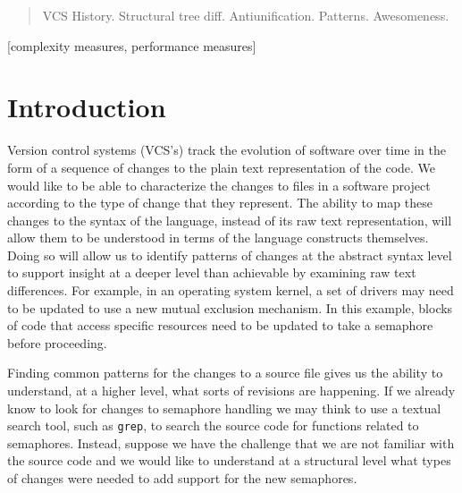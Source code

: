 \documentclass{acm_proc_article-sp}
\begin{document}
\maketitle
\begin{abstract}
VCS History. Structural tree diff. Antiunification. Patterns.
Awesomeness.
\end{abstract}

[complexity measures, performance measures]



\section{Introduction}

Version control systems (VCS's) track the evolution of software over time in the form
of a sequence of changes to the plain text representation of the code.
We would like to be able to characterize the changes to files in a software
project according to the type of change that they represent.  The ability to
map these changes to the syntax of the language, instead of its raw text
representation, will allow them to be understood in terms of the language
constructs themselves.  Doing so will allow us to identify patterns of
changes at the abstract syntax level to support insight at a deeper level
than achievable by examining raw text differences.  For example, in
an operating system kernel, a set of drivers may need to be updated to use a
new mutual exclusion mechanism. In this example, blocks of code that access
specific resources need to be updated to take a semaphore before proceeding.

Finding common patterns for the changes to a source file gives us the ability
to understand, at a higher level, what sorts of revisions are happening. If we
already know to look for changes to semaphore handling we may think to use a
textual search tool, such as {\tt grep}, to search the source code for
functions related to semaphores. Instead, suppose we have the challenge that we
are not familiar with the source code and we would like to understand at a
structural level what types of changes were needed to add support for the new
semaphores.
\end{document}
